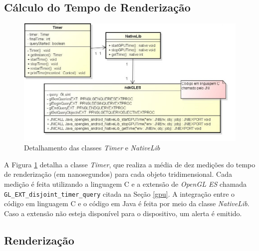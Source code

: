 \subsection{Cálculo do Tempo de Renderização}      

	\begin{figure}[ht]
	\centering
		\includegraphics[keepaspectratio=true,scale=0.6]{figuras/timer_nativelib.jpg}
	\caption{Detalhamento das classes \textit{Timer} e \textit{NativeLib}}
	\label{timer_nativelib}
	\end{figure}

	A Figura \ref{timer_nativelib} detalha a classe \textit{Timer}, que realiza a média de dez medições do tempo de renderização (em nanosegundos) para cada objeto tridimensional. Cada medição é feita utilizando a linguagem C e a extensão de \textit{OpenGL ES} chamada \texttt{GL\_EXT\_disjoint\_timer\_query} citada na Seção \ref{gpu}.  A integração entre o código em linguagem C e o código em Java é feita por meio da classe \textit{NativeLib}. Caso a extensão não esteja disponível para o dispositivo, um alerta é emitido.

\subsection{Renderização}    

